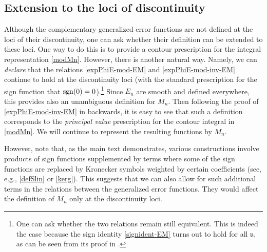 \documentclass[12pt,letterpaper]{JHEP3}
\newcommand{\sgn}{{\rm sgn}}
\def\vu{\mathfrak{u}}
\begin{document}
\subsection{Extension to the loci of discontinuity}
\label{ap-extension}

Although the complementary generalized error functions are not defined at the loci of their discontinuity,
one can ask whether their definition can be extended to these loci.
One way to do this is to provide a contour prescription for the integral representation \eqref{modMn}.
However, there is another natural way. Namely, we can {\it declare} that the relations \eqref{expPhiE-mod-EM} and 
\eqref{expPhiE-mod-inv-EM} continue to hold at the discontinuity loci 
(with the standard prescription for the sign function that $\sgn(0)=0$).\footnote{One can ask whether the two relations remain still equivalent.
This is indeed the case because the sign identity \eqref{signident-EM} turns out to hold for all $\vu$, as can be seen from 
its proof in \cite[\S A]{Nazaroglu:2016lmr}.}
Since $E_n$ are smooth and defined everywhere, this provides also an unambiguous definition for $M_n$. 
Then following the proof of \eqref{expPhiE-mod-inv-EM} in \cite[Prop.3.9]{Nazaroglu:2016lmr} backwards, it is easy to see that 
such a definition corresponds to the {\it principal value} prescription for the contour integral in \eqref{modMn}.
We will continue to represent the resulting functions by $M_n$.

However, note that, as the main text demonstrates, various constructions involve products of sign functions
supplemented by terms where some of the sign functions are replaced by Kronecker symbols weighted by certain coefficients
(see, e.g., \eqref{defSlin} or \eqref{kerg}).
This suggests that we can also allow for such additional terms in the relations between the generalized error functions.
They would affect the definition of $M_n$ only at the discontinuity loci.
\end{document}
